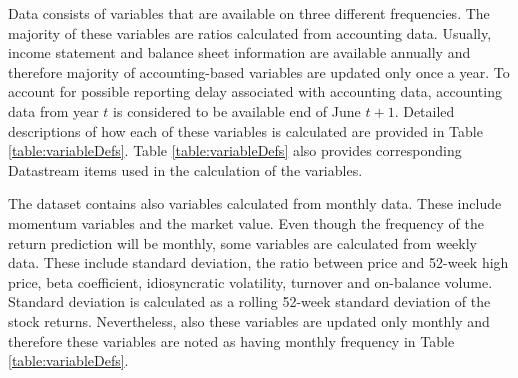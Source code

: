 \documentclass[12pt]{article}
\begin{document}
Data consists of variables that are available on three different frequencies. The majority of these variables are ratios calculated from accounting data. 
Usually, income statement and balance sheet information are available annually and therefore majority of accounting-based variables are updated only once a year. To account for possible reporting delay associated with accounting data, accounting data from year $t$ is considered to be available end of June $t+1$. Detailed descriptions of how each of these variables is calculated are provided in Table \ref{table:variableDefs}. Table \ref{table:variableDefs} also provides corresponding Datastream items used in the calculation of the variables. 

The dataset contains also variables calculated from monthly data. These include momentum variables and the market value. Even though the frequency of the return prediction will be monthly, some variables are calculated from weekly data. These include standard deviation, the ratio between price and 52-week high price, beta coefficient, idiosyncratic volatility, turnover and on-balance volume. Standard deviation is calculated as a rolling 52-week standard deviation of the stock returns. Nevertheless, also these variables are updated only monthly and therefore these variables are noted as having monthly frequency in Table \ref{table:variableDefs}. \par
\end{document}

